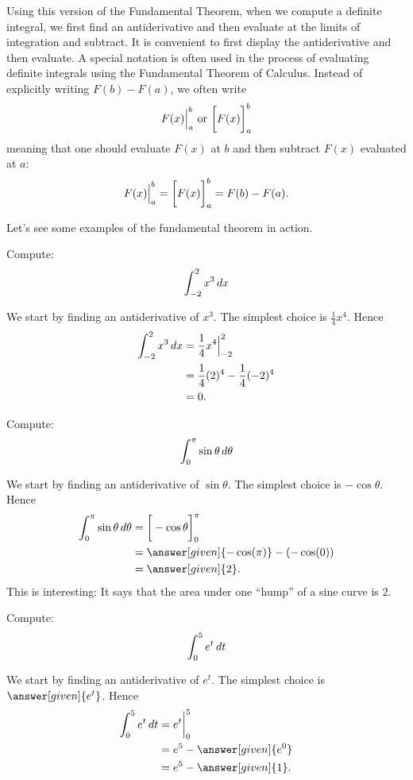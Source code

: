 \documentclass{ximera}
\begin{document}
Using this version of the Fundamental Theorem, when we compute a definite integral, we first find an antiderivative
and then evaluate at the limits of integration and subtract. It is convenient to
first display the antiderivative and then evaluate.  A special
notation is often used in the process of evaluating definite integrals
using the Fundamental Theorem of Calculus. Instead of explicitly
writing $F(b)-F(a)$, we often write
\[
F(x)\Bigr\vert_a^b \mbox{  or  } \bigg[ F(x) \bigg]_a^b
\]
meaning that one should evaluate $F(x)$ at $b$ and then subtract
$F(x)$ evaluated at $a$:
\[
F(x)\Bigr\vert_a^b =\bigg[ F(x) \bigg]_a^b= F(b)-F(a).
\]

Let's see some examples of the fundamental theorem in action.

\begin{example}
  Compute:
  \[
  \int_{-2}^2 x^3\mathop{}\!d x
  \]
  \begin{explanation}
    We start by finding an antiderivative of $x^3$. The simplest choice is $\frac{1}{4}x^{4}$. Hence
    \begin{align*}
      \int_{-2}^2 x^3 \mathop{}\!d x &=\frac{1}{4}x^4\Bigr\vert_{-2}^2\\
      &= \frac{1}{4}(2)^4 - \frac{1}{4}(-2)^4\\
      &= 0.
    \end{align*}
  \end{explanation}
\end{example}


\begin{example}
  Compute:
  \[
  \int_0^\pi \sin \theta \mathop{}\!d \theta
  \]
  \begin{explanation}
    We start by finding an antiderivative of $\sin \theta$. The simplest choice is $-\cos\theta$. Hence
    \begin{align*}
      \int_0^\pi \sin\theta \d \theta &= \eval{-\cos\theta}_0^{\pi}\\
      &=\answer[given]{-\cos(\pi)} - (-\cos(0))\\
      &=\answer[given]{2}.
    \end{align*}
    This is interesting: It says that the area under one ``hump'' of a
    sine curve is $2$.
  \end{explanation}
\end{example}

\begin{example}
  Compute:
  \[
  \int_0^5 e^t\mathop{}\!d t
  \]
  \begin{explanation}
    We start by finding an antiderivative of $e^t$. The simplest choice is $\answer[given]{e^t}$. Hence
    \begin{align*}
      \int_0^5 e^t \d t &= e^t\biggr\vert_0^5 \\
      &= e^5-\answer[given]{e^0}\\
      &= e^5-\answer[given]{1}.
    \end{align*}
  \end{explanation}
\end{example}
\end{document}
